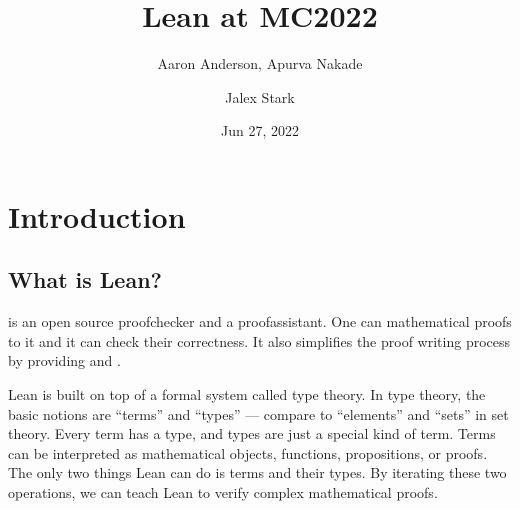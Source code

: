 \documentclass[letterpaper,10pt,english]{sphinxmanual}
\title{Lean at MC2022}
\date{Jun 27, 2022}
\author{Aaron Anderson, Apurva Nakade \and Jalex Stark}
\begin{document}
\pagestyle{empty}
\sphinxmaketitle
\pagestyle{plain}
\sphinxtableofcontents
\pagestyle{normal}
\label{\detokenize{index::doc}}


\sphinxstepscope


\chapter{Introduction}
\label{\detokenize{introduction:introduction}}\label{\detokenize{introduction:id1}}\label{\detokenize{introduction::doc}}

\section{What is Lean?}
\label{\detokenize{introduction:what-is-lean}}
\sphinxAtStartPar
{} is an open source proof\sphinxhyphen{}checker and a proof\sphinxhyphen{}assistant.
One can  mathematical proofs to it and it can check their correctness.
It also simplifies the proof writing process by providing  and .

\sphinxAtStartPar
Lean is built on top of a formal system called type theory.
In type theory, the basic notions are “terms” and “types” — compare to “elements” and “sets” in set theory.
Every term has a type, and types are just a special kind of term.
Terms can be interpreted as mathematical objects, functions, propositions, or proofs.
The only two things Lean can do is  terms and  their types.
By iterating these two operations, we can teach Lean to verify complex mathematical proofs.
\end{document}
